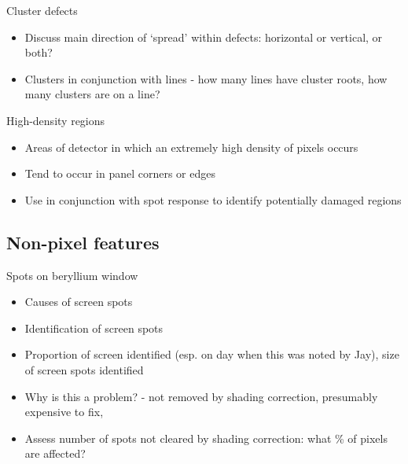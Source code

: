\documentclass{beamer}
\begin{document}
\begin{frame}{Cluster defects}

	\begin{itemize}
		\item Discuss main direction of `spread' within defects: horizontal or vertical, or both?
		\item Clusters in conjunction with lines - how many lines have cluster roots, how many clusters are on a line?
	\end{itemize}

\end{frame}


\begin{frame}{High-density regions}

	\begin{itemize}
		\item Areas of detector in which an extremely high density of pixels occurs
		\item Tend to occur in panel corners or edges
		\item Use in conjunction with spot response to identify potentially damaged regions 
	\end{itemize}

\end{frame}


\subsection{Non-pixel features}

\begin{frame}{Spots on beryllium window}

	\begin{itemize}
	
		\item Causes of screen spots
		
		\item Identification of screen spots
		
		\item Proportion of screen identified (esp. on day when this was noted by Jay), size of screen spots identified
		
		\item Why is this a problem? - not removed by shading correction, presumably expensive to fix, 
		
		\item Assess number of spots not cleared by shading correction: what \% of pixels are affected?
	
	\end{itemize}
	
\end{frame}
\end{document}
